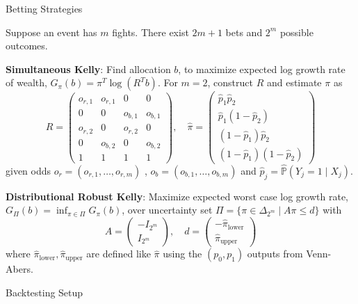 \documentclass[final]{beamer}
\newlength{\colwidth}
\begin{document}
\begin{frame}[t]
\begin{columns}[t]
\begin{column}{\colwidth}
  \vspace{-30pt}
  \begin{block}{Betting Strategies}

    Suppose an event has $m$ fights. There exist $2m + 1$ bets and $2^m$ possible outcomes.

    \textbf{Simultaneous Kelly}: Find allocation $b$, to maximize expected log growth rate of wealth, $G_{\pi} (b) = \pi^T \log(R^Tb)$. For $m = 2$, construct $R$ and estimate $\pi$ as
    $$R = \begin{pmatrix}
    o_{r, 1} & o_{r, 1} & 0 & 0 \\
    0 & 0 & o_{b, 1} & o_{b, 1} \\
    o_{r, 2} & 0 & o_{r, 2} & 0 \\
    0 & o_{b, 2} & 0 & o_{b, 2} \\
    1 & 1 & 1 & 1
    \end{pmatrix}, \quad \hat{\pi} = \begin{pmatrix}
        \hat{p}_1 \hat{p}_2 \\
        \hat{p}_1 (1 - \hat{p}_2) \\
        (1 - \hat{p}_1) \hat{p}_2 \\
        (1 - \hat{p}_1) (1 - \hat{p}_2)
    \end{pmatrix}$$
    given odds $o_{r} = (o_{r,1}, \ldots, o_{r,m})$ , $o_b = (o_{b,1}, \ldots, o_{b,m})$ and $\hat{p}_j = \hat{\mathbb{P}}(Y_j = 1 \mid X_j)$.

    \textbf{Distributional Robust Kelly}: Maximize expected worst case log growth rate, $G_{\Pi}(b) = \inf_{\pi \in \Pi} G_{\pi} (b)$, over uncertainty set $\Pi = \{\pi \in \Delta_{2^m} \mid A \pi \leq d \}$ with
    $$A = \begin{pmatrix}
        - I_{2^m} \\
        I_{2^m}
    \end{pmatrix}, \quad d = \begin{pmatrix}
        -\hat{\pi}_{\text{lower}} \\
        \hat{\pi}_{\text{upper}}
    \end{pmatrix}$$
    where $\hat{\pi}_{\text{lower}}, \hat{\pi}_{\text{upper}}$ are defined like $\hat{\pi}$ using the $(p_0, p_1)$ outputs from Venn-Abers.

  \end{block}
  \vspace{-20pt}
  \begin{block}{Backtesting Setup}


\end{block}
\end{column}
\end{columns}
\end{frame}
\end{document}
